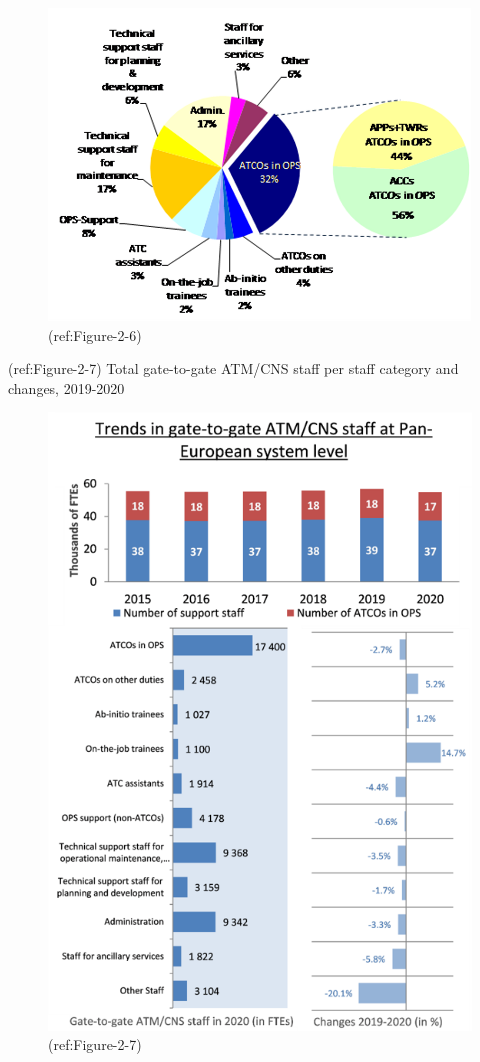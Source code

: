 \documentclass[
]{book}
\begin{document}
\begin{figure}

{\centering \includegraphics[width=0.6\linewidth]{figures/Figure-2-6} 

}

\caption{(ref:Figure-2-6)}\label{fig:Figure-2-6}
\end{figure}

(ref:Figure-2-7) Total gate-to-gate ATM/CNS staff per staff category and
changes, 2019-2020

\begin{figure}

{\centering \includegraphics[width=0.7\linewidth]{figures/Figure-2-7} 

}

\caption{(ref:Figure-2-7)}\label{fig:Figure-2-7}
\end{figure}
\end{document}
